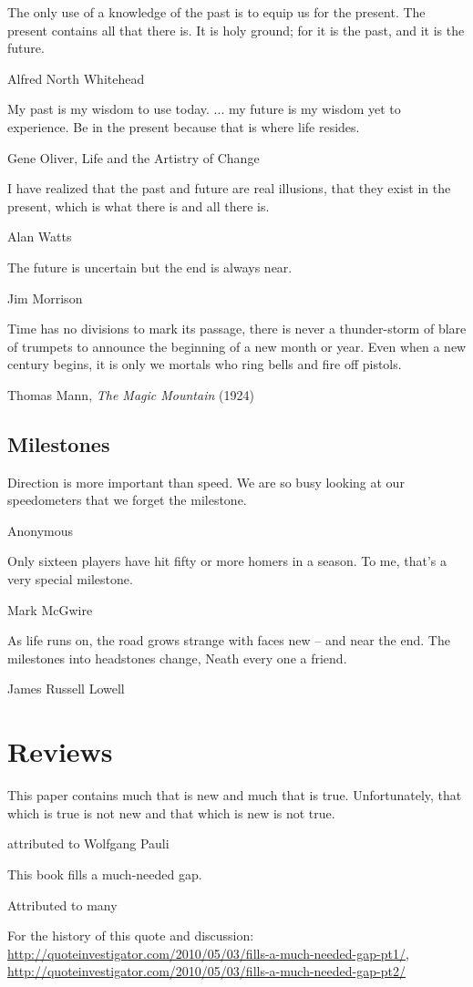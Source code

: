 \epigraph{The only use of a knowledge of the past is to equip us for the present. The present contains all that there is. It is holy ground; for it is the past, and it is the future.}{Alfred North Whitehead} %

\epigraph{My past is my wisdom to use today. ... my future is my wisdom yet to experience. Be in the present because that is where life resides.}{Gene Oliver, Life and the Artistry of Change}

\epigraph{I have realized that the past and future are real illusions, that they exist in the present, which is what there is and all there is.}{Alan Watts}

\epigraph{The future is uncertain but the end is always near.}{Jim Morrison}

\epigraph{Time has no divisions to mark its passage, there is never a thunder-storm of blare of trumpets to announce the beginning of a new month or year. Even when a new century begins, it is only we mortals who ring bells and fire off pistols.}{Thomas Mann, \emph{The Magic Mountain} (1924)}

\subsection{Milestones}

\epigraph{Direction is more important than speed. We are so busy looking at our speedometers that we forget the milestone.}{Anonymous}

\epigraph{Only sixteen players have hit fifty or more homers in a season. To me, that's a very special milestone.}{Mark McGwire}

\epigraph{As life runs on, the road grows strange with faces new -- and near the end. The milestones into headstones change, Neath every one a friend.}{James Russell Lowell}

\section{Reviews}
\epigraph{This paper contains much that is new and much that is true. Unfortunately, that which is true is not new and that which is new is not true.}{attributed to Wolfgang Pauli}

\epigraph{This book fills a much-needed gap.}{Attributed to many}

For the history of this quote and discussion:
\url{http://quoteinvestigator.com/2010/05/03/fills-a-much-needed-gap-pt1/}, 
\url{http://quoteinvestigator.com/2010/05/03/fills-a-much-needed-gap-pt2/}

